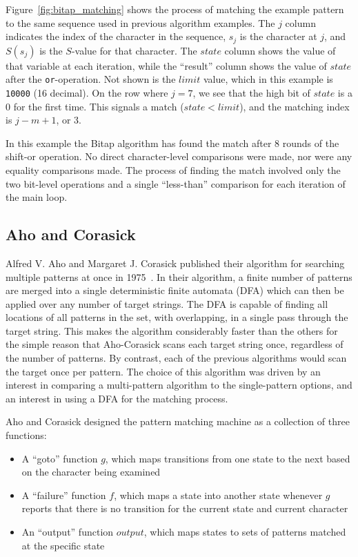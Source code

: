 Figure~\ref{fig:bitap_matching} shows the process of matching the example pattern to the same sequence used in previous algorithm examples. The $j$ column indicates the index of the character in the sequence, $s_j$ is the character at $j$, and $S(s_j)$ is the $S$-value for that character. The $state$ column shows the value of that variable at each iteration, while the ``result'' column shows the value of $state$ after the \texttt{or}-operation. Not shown is the $limit$ value, which in this example is \texttt{10000} (16 decimal). On the row where $j = 7$, we see that the high bit of $state$ is a 0 for the first time. This signals a match ($state < limit$), and the matching index is $j - m + 1$, or 3.

In this example the Bitap algorithm has found the match after 8 rounds of the shift-or operation. No direct character-level comparisons were made, nor were any equality comparisons made. The process of finding the match involved only the two bit-level operations and a single ``less-than'' comparison for each iteration of the main loop.

\subsection{Aho and Corasick}

Alfred V. Aho and Margaret J. Corasick published their algorithm for searching multiple patterns at once in 1975~\cite{aho.corasick.1975}. In their algorithm, a finite number of patterns are merged into a single deterministic finite automata (DFA) which can then be applied over any number of target strings. The DFA is capable of finding all locations of all patterns in the set, with overlapping, in a single pass through the target string. This makes the algorithm considerably faster than the others for the simple reason that Aho-Corasick scans each target string once, regardless of the number of patterns. By contrast, each of the previous algorithms would scan the target once per pattern. The choice of this algorithm was driven by an interest in comparing a multi-pattern algorithm to the single-pattern options, and an interest in using a DFA for the matching process.

Aho and Corasick designed the pattern matching machine as a collection of three functions:

\begin{itemize}
\item A ``goto'' function $g$, which maps transitions from one state to the next based on the character being examined
\item A ``failure'' function $f$, which maps a state into another state whenever $g$ reports that there is no transition for the current state and current character
\item An ``output'' function $output$, which maps states to sets of patterns matched at the specific state
\end{itemize}

